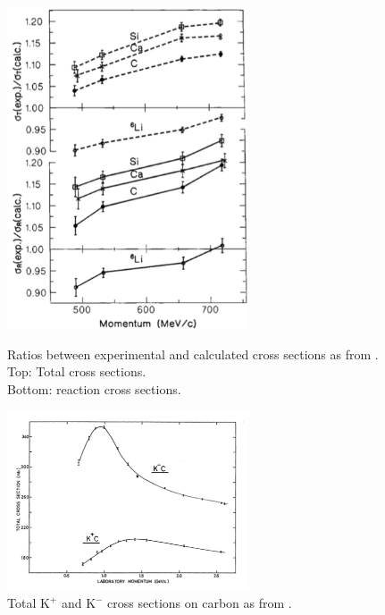 \begin{figure}
\captionsetup{justification=raggedright}  
	\begin{minipage}[t]{.53\textwidth}  
	  \centering  
	   \includegraphics[width=2.8in]{Chapter-1/Images/Friedmann.png}
	   	        \caption{Ratios between experimental and calculated cross sections as from \cite{Friedman:1997eq}. Top: Total cross sections. \\Bottom: reaction cross sections.}
        \label{fig:Friedmann}
	\end{minipage}%
	\begin{minipage}[t]{0.53\textwidth}  
	  \centering  
	\includegraphics[width=2.8in]{Chapter-1/Images/Bugg.png}
        \caption{Total K$^+$  and K$^-$ cross sections on carbon as from \cite{PhysRev.168.1466}.}
        \label{fig:Bugg}
	\end{minipage}
	\par
\end{figure}






